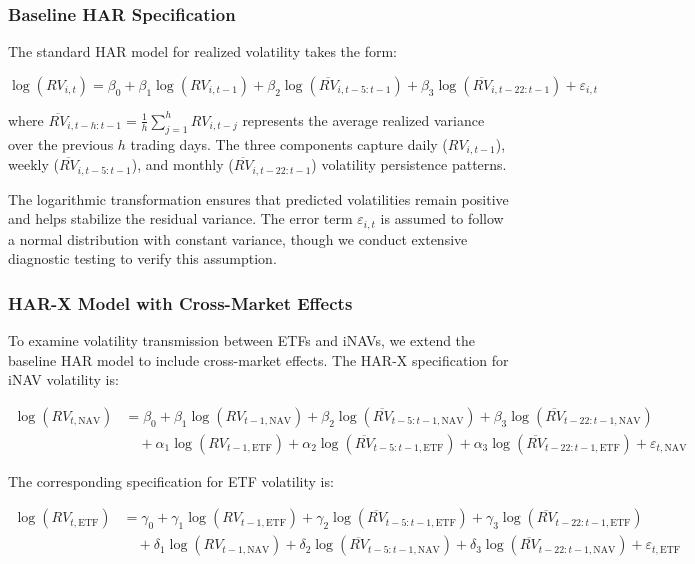 \subsubsection{Baseline HAR Specification}

The standard HAR model for realized volatility takes the form:

\begin{equation} \label{eq:har_baseline}
\log(RV_{i,t}) = \beta_0 + \beta_1 \log(RV_{i,t-1}) + \beta_2 \log(\overline{RV}_{i,t-5:t-1}) + \beta_3 \log(\overline{RV}_{i,t-22:t-1}) + \varepsilon_{i,t}
\end{equation}

where $\overline{RV}_{i,t-h:t-1} = \frac{1}{h}\sum_{j=1}^{h} RV_{i,t-j}$ represents the average realized variance over the previous $h$ trading days. The three components capture daily ($RV_{i,t-1}$), weekly ($\overline{RV}_{i,t-5:t-1}$), and monthly ($\overline{RV}_{i,t-22:t-1}$) volatility persistence patterns.

The logarithmic transformation ensures that predicted volatilities remain positive and helps stabilize the residual variance. The error term $\varepsilon_{i,t}$ is assumed to follow a normal distribution with constant variance, though we conduct extensive diagnostic testing to verify this assumption.

\subsubsection{HAR-X Model with Cross-Market Effects}

To examine volatility transmission between ETFs and iNAVs, we extend the baseline HAR model to include cross-market effects. The HAR-X specification for iNAV volatility is:

\begin{align} \label{eq:har_x_nav}
\log(RV_{t,\text{NAV}}) &= \beta_0 + \beta_1 \log(RV_{t-1,\text{NAV}}) + \beta_2 \log(\overline{RV}_{t-5:t-1,\text{NAV}}) + \beta_3 \log(\overline{RV}_{t-22:t-1,\text{NAV}}) \\
&\quad + \alpha_1 \log(RV_{t-1,\text{ETF}}) + \alpha_2 \log(\overline{RV}_{t-5:t-1,\text{ETF}}) + \alpha_3 \log(\overline{RV}_{t-22:t-1,\text{ETF}}) + \varepsilon_{t,\text{NAV}} \nonumber
\end{align}

The corresponding specification for ETF volatility is:

\begin{align} \label{eq:har_x_etf}
\log(RV_{t,\text{ETF}}) &= \gamma_0 + \gamma_1 \log(RV_{t-1,\text{ETF}}) + \gamma_2 \log(\overline{RV}_{t-5:t-1,\text{ETF}}) + \gamma_3 \log(\overline{RV}_{t-22:t-1,\text{ETF}}) \\
&\quad + \delta_1 \log(RV_{t-1,\text{NAV}}) + \delta_2 \log(\overline{RV}_{t-5:t-1,\text{NAV}}) + \delta_3 \log(\overline{RV}_{t-22:t-1,\text{NAV}}) + \varepsilon_{t,\text{ETF}} \nonumber
\end{align}

